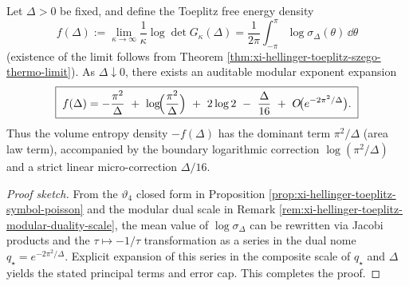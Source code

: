 \begin{theorem}\label{thm:xi-hellinger-toeplitz-free-energy-area-law}
Let \(\Delta>0\) be fixed, and define the Toeplitz free energy density
\[
f(\Delta):=\lim_{\kappa\to\infty}\frac{1}{\kappa}\log\det G_\kappa(\Delta)
=\frac{1}{2\pi}\int_{-\pi}^{\pi}\log\sigma_\Delta(\theta)\,\dd\theta
\]
(existence of the limit follows from Theorem \ref{thm:xi-hellinger-toeplitz-szego-thermo-limit}).
As \(\Delta\downarrow0\), there exists an auditable modular exponent expansion
\[
\boxed{\;
f(\Delta)= -\frac{\pi^{2}}{\Delta}\ +\ \log\!\Bigl(\frac{\pi^{2}}{\Delta}\Bigr)\ +\ 2\log 2\ -\ \frac{\Delta}{16}\ +\ O\!\bigl(e^{-2\pi^{2}/\Delta}\bigr).\;}
\]
Thus the volume entropy density \(-f(\Delta)\) has the dominant term \(\pi^2/\Delta\) (area law term), accompanied by the boundary logarithmic correction \(\log(\pi^2/\Delta)\) and a strict linear micro-correction \(\Delta/16\).
\end{theorem}
\begin{proof}[Proof sketch]
From the \(\vartheta_4\) closed form in Proposition \ref{prop:xi-hellinger-toeplitz-symbol-poisson} and the modular dual scale in Remark \ref{rem:xi-hellinger-toeplitz-modular-duality-scale},
the mean value of \(\log\sigma_\Delta\) can be rewritten via Jacobi products and the \(\tau\mapsto-1/\tau\) transformation as a series in the dual nome \(q_\star=e^{-2\pi^2/\Delta}\).
Explicit expansion of this series in the composite scale of \(q_\star\) and \(\Delta\) yields the stated principal terms and error cap. This completes the proof.
\end{proof}

